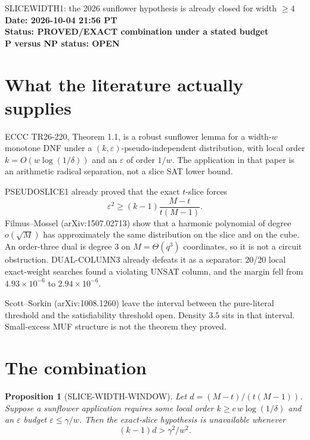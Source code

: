 \documentclass[11pt]{article}
\newtheorem{proposition}{Proposition}
\begin{document}
\begin{center}
{\Large SLICEWIDTH1: the 2026 sunflower hypothesis is already closed for width $\ge 4$}\\[4pt]
\textbf{Date: 2026-10-04 21:56 PT}\\
\textbf{Status: PROVED/EXACT combination under a stated budget}\\
\textbf{P versus NP status: OPEN}
\end{center}

\section{What the literature actually supplies}

ECCC TR26-220, Theorem 1.1, is a robust sunflower lemma for a width-$w$ monotone DNF under a $(k,\varepsilon)$-pseudo-independent distribution, with local order $k=O(w\log(1/\delta))$ and an $\varepsilon$ of order $1/w$. The application in that paper is an arithmetic radical separation, not a slice SAT lower bound.

PSEUDOSLICE1 already proved that the exact $t$-slice forces
\[
\varepsilon^2\ge (k-1)\frac{M-t}{t(M-1)}.
\]
Filmus--Mossel (arXiv:1507.02713) show that a harmonic polynomial of degree $o(\sqrt M)$ has approximately the same distribution on the slice and on the cube. An order-three dual is degree 3 on $M=\Theta(q^3)$ coordinates, so it is not a circuit obstruction. DUAL-COLUMN3 already defeats it as a separator: 20/20 local exact-weight searches found a violating UNSAT column, and the margin fell from $4.93\times 10^{-6}$ to $2.94\times 10^{-6}$.

Scott--Sorkin (arXiv:1008.1260) leave the interval between the pure-literal threshold and the satisfiability threshold open. Density $3.5$ sits in that interval. Small-excess MUF structure is not the theorem they proved.

\section{The combination}

\begin{proposition}[SLICE-WIDTH-WINDOW]
Let $d=(M-t)/(t(M-1))$. Suppose a sunflower application requires some local order $k\ge c\, w\log(1/\delta)$ and an $\varepsilon$ budget $\varepsilon\le \gamma/w$. Then the exact-slice hypothesis is unavailable whenever
\[
(k-1)d > \gamma^2/w^2.
\]
\end{proposition}
\end{document}
